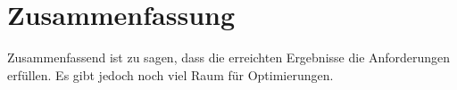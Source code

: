 \documentclass[liststotoc,11pt,a4paper]{article}
\begin{document}




\section{Zusammenfassung}
Zusammenfassend ist zu sagen, dass die erreichten Ergebnisse die Anforderungen erfüllen. Es gibt jedoch noch viel Raum für Optimierungen. 


\newpage
{}
\setcounter{page}{3}
\renewcommand{\refname}{Referenzen}

\end{document}
